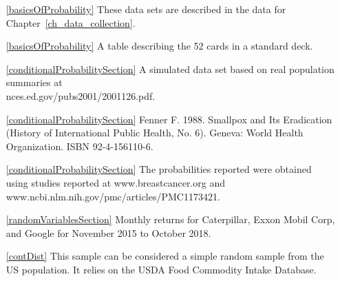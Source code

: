 \begin{itemize}
\item[\ref{basicsOfProbability}]
    These data sets are described in
    the data for Chapter~\ref{ch_data_collection}.
\item[\ref{basicsOfProbability}]
    A table describing the 52 cards in a standard deck.

\item[\ref{conditionalProbabilitySection}]
    A simulated data set based on real population summaries at\\
        {nces.ed.gov/pubs2001/2001126.pdf}.
\item[\ref{conditionalProbabilitySection}]
    Fenner F. 1988.
    Smallpox and Its Eradication
    (History of International Public Health, No. 6).
    Geneva: World Health Organization. ISBN 92-4-156110-6.

\item[\ref{conditionalProbabilitySection}]
    The probabilities reported were obtained using studies
    reported at
        {www.breastcancer.org}
    and 
        {www.ncbi.nlm.nih.gov/pmc/articles/PMC1173421}. 

\item[\ref{randomVariablesSection}]
    Monthly returns for Caterpillar, Exxon Mobil Corp,
    and Google for November 2015 to October 2018.

\item[\ref{contDist}]
    This sample can be considered a simple random sample
    from the US population.
    It relies on the USDA Food Commodity Intake Database.

\end{itemize}




\D{\newpage}


